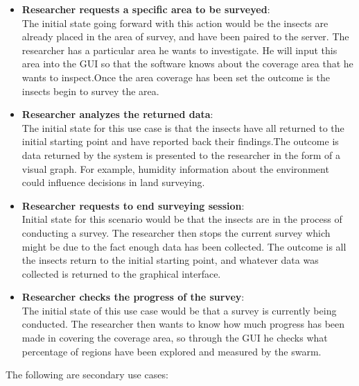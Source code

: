 \documentclass[11pt]{article}
\begin{document}
\begin{itemize}
    \item \textbf{Researcher requests a specific area to be surveyed}:\\
        The initial state going forward with this action would be the insects are already placed in the area of survey, and have been paired to the server. The researcher has a particular area he wants to investigate. He will input this area into the GUI so that the software knows about the coverage area that he wants to inspect.Once the area coverage has been set the outcome is the insects begin to survey the area. 
    \item \textbf{Researcher analyzes the returned data}:\\
        The initial state for this use case is that the insects have all returned to the initial starting point and have reported back their findings.The outcome is data returned by the system is presented to the researcher in the form of a visual graph. For example, humidity information about the environment could influence decisions in land surveying.
    \item \textbf{Researcher requests to end surveying session}:\\
        Initial state for this scenario would be that the insects are in the process of conducting a survey. The researcher then stops the current survey which might be due to the fact enough data has been collected. The outcome is all the insects return to the initial starting point, and whatever data was collected is returned to the graphical interface. 
    \item \textbf{Researcher checks the progress of the survey}:\\
        The initial state of this use case would be that a survey is currently being conducted. The researcher then wants to know how much progress has been made in covering the coverage area, so through the GUI he checks what percentage of regions have been explored and measured by the swarm.
\end{itemize}

The following are secondary use cases:
\end{document}
